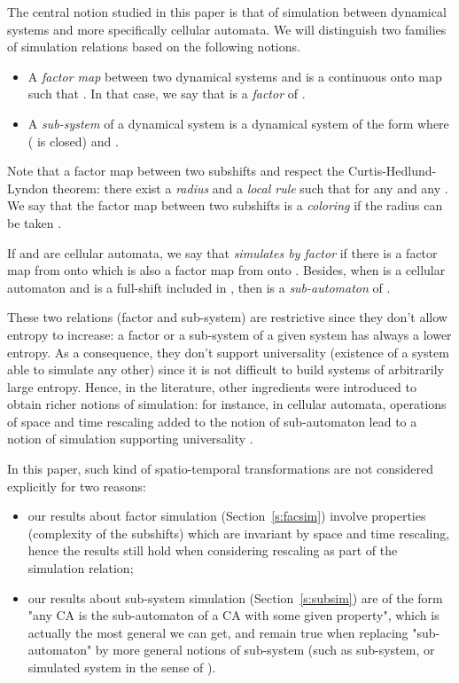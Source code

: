 \documentclass{jac}
\let\dfn\emph
\theoremstyle{definition}
\begin{document}
The central notion studied in this paper is that of simulation between dynamical
systems and more specifically cellular automata. We will distinguish two
families of simulation relations based on the following notions.

\begin{defi}\leavevmode \begin{itemize}
  \item A \dfn{factor map} between two dynamical systems  and  is a
    continuous onto map  such that .
    In that case, we say that  is a \dfn{factor} of . 
  \item A \dfn{sub-system} of a dynamical system  is a dynamical system of
    the form  where  ( is closed) and .
\end{itemize}
\end{defi}

Note that a factor map  between two subshifts  and  respect the Curtis-Hedlund-Lyndon theorem: there exist a \dfn{radius}  and a \dfn{local rule}  such that  for any  and any . We say that the factor map between two subshifts is a \dfn{coloring} if the radius can be taken .

If  and  are cellular automata, we say that \emph{ simulates  by factor} if there is a factor map  from  onto  which is also a factor map from  onto .
Besides, when  is a cellular automaton and  is a full-shift included in , then  is a \dfn{sub-automaton} of . 

These two relations (factor and sub-system) are restrictive since they don't allow entropy to increase: a factor or a sub-system of a given system has always a lower entropy. As a consequence, they don't support universality (existence of a system able to simulate any other) since it is not difficult to build systems of arbitrarily large entropy. Hence, in the literature, other ingredients were introduced to obtain richer notions of simulation: for instance, in cellular automata, operations of space and time rescaling added to the notion of sub-automaton lead to a notion of simulation supporting universality \cite{bulk1,bulk2}. 
 
In this paper, such kind of spatio-temporal transformations are not considered explicitly for two reasons:
\begin{itemize}
\item our results about factor simulation (Section~\ref{s:facsim}) involve properties
(complexity of the subshifts) which are invariant by space and time
rescaling, hence the results still hold when considering rescaling as part of the simulation relation;
\item our results about sub-system simulation (Section~\ref{s:subsim}) are of the form
"any CA is the sub-automaton of a CA with some given property", which is
actually the most general we can get, and remain true when replacing
"sub-automaton" by more general notions of sub-system (such as
sub-system, or simulated system in the sense of \cite{bulk2}).
\end{itemize}
\end{document}
